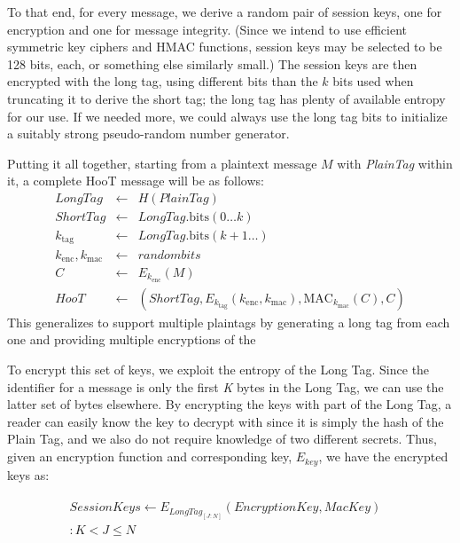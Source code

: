 To that end, for every message, we derive a random pair of session keys, one for encryption and one for message integrity. (Since we intend to use efficient symmetric key ciphers and HMAC functions, session keys may be selected to be 128 bits, each, or something else similarly small.) The session keys are then encrypted with the long tag, using different bits than the $k$ bits used when truncating it to derive the short tag; the long tag has plenty of available entropy for our use. If we needed more, we could always use the long tag bits to initialize a suitably strong pseudo-random number generator.

Putting it all together, starting from a plaintext message $M$ with {\em PlainTag} within it, a complete HooT message will be as follows:
%
\begin{eqnarray*}
\mathit{LongTag} & \leftarrow & H(\mathit{PlainTag}) \\
\mathit{ShortTag} & \leftarrow & \mathit{LongTag}.\mathrm{bits}(0 \ldots k) \\
k_{\mathrm{tag}} & \leftarrow & \mathit{LongTag}.\mathrm{bits}(k+1 \ldots) \\
k_{\mathrm{enc}}, k_{\mathrm{mac}} & \leftarrow & \mathit{random bits} \\
C & \leftarrow & E_{k_{\mathrm{enc}}}(M) \\
\mathit{HooT}  & \leftarrow &  \left(\mathit{ShortTag}, E_{k_{\mathrm{tag}}} \left(k_{\mathrm{enc}}, k_{\mathrm{mac}}\right), \mathrm{MAC}_{k_{\mathrm{mac}}}(C), C\right)
\end{eqnarray*}
%
This generalizes to support multiple plaintags by generating a long tag from each one and providing multiple encryptions of the 


To encrypt this set of keys, we exploit the entropy of the Long Tag. Since the identifier for a message is only the first \textit{K} bytes in the Long Tag, we can use the latter set of bytes elsewhere. By encrypting the keys with part of the Long Tag, a reader can easily know the key to decrypt with since it is simply the hash of the Plain Tag, and we also do not require knowledge of two different secrets. Thus, given an encryption function and corresponding key, \textit{$E_{key}$}, we have the encrypted keys as:

\begin{align*}
\begin{split}
	\mathit{Session Keys} \leftarrow E_{\mathit{LongTag}_{[J:N]}}\left(\mathit{EncryptionKey},\mathit{MacKey}\right)& \\
	: K < J \leq N &
\end{split}	
\end{align*}

